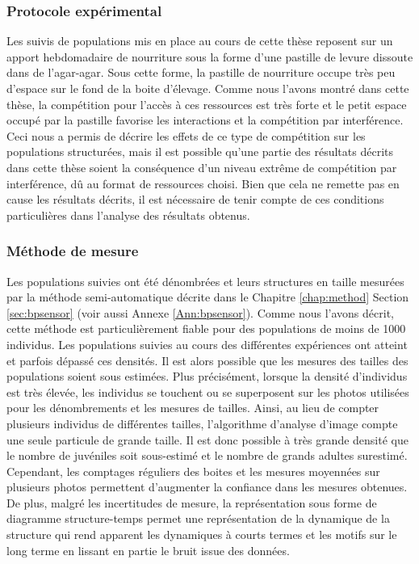 \subsubsection{Protocole expérimental}

Les suivis de populations mis en place au cours de cette thèse reposent sur un
apport hebdomadaire de nourriture sous la forme d'une pastille de levure
dissoute dans de l'agar-agar. Sous cette forme, la pastille de nourriture occupe
très peu d'espace sur le fond de la boite d'élevage. Comme nous l'avons montré
dans cette thèse, la compétition pour l'accès à ces ressources est très forte et
le petit espace occupé par la pastille favorise les interactions et la
compétition par interférence. Ceci nous a permis de décrire les effets de ce
type de compétition sur les populations structurées, mais il est possible qu'une
partie des résultats décrits dans cette thèse soient la conséquence d'un niveau
extrême de compétition par interférence, dû au format de ressources choisi. Bien
que cela ne remette pas en cause les résultats décrits, il est nécessaire de
tenir compte de ces conditions particulières dans l'analyse des résultats
obtenus.

\subsubsection{Méthode de mesure}

Les populations suivies ont été dénombrées et leurs structures en taille
mesurées par la méthode semi-automatique décrite dans le Chapitre \ref{chap:method}
Section \ref{sec:bpsensor} (voir aussi Annexe \ref{Ann:bpsensor}).
Comme nous l'avons décrit, cette méthode est particulièrement fiable pour des
populations de moins de 1000 individus. Les populations suivies au cours des
différentes expériences ont atteint et parfois dépassé ces densités.
Il est alors possible que les mesures des tailles des populations soient
sous estimées. Plus précisément, lorsque la densité d'individus est très
élevée, les individus se touchent ou se superposent sur les photos utilisées
pour les dénombrements et les mesures de tailles. Ainsi, au lieu de compter
plusieurs individus de différentes tailles, l'algorithme d'analyse d'image
compte une seule particule de grande taille. Il est donc possible à très grande
densité que le nombre de juvéniles soit sous-estimé et le nombre de grands
adultes surestimé. Cependant, les comptages réguliers des boites et les mesures
moyennées sur plusieurs photos permettent d'augmenter la confiance dans les
mesures obtenues. De plus, malgré les incertitudes de mesure, la représentation
sous forme de diagramme structure-temps permet une représentation de la
dynamique de la structure qui rend apparent les dynamiques à courts termes et
les motifs sur le long terme en lissant en partie le bruit issue des données.

